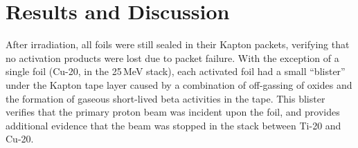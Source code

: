 \section{\label{sec:results_fe}Results and Discussion}



After irradiation, all foils were 
still sealed in their Kapton packets, verifying that no activation products were lost due to packet failure.
With the exception of a single foil (Cu-20, in the 25\,MeV stack), each activated foil had a small \enquote{blister} under the Kapton tape layer caused by a combination of 
off-gassing of oxides and the formation of gaseous short-lived beta activities in the tape.
This blister   verifies that the primary proton beam was incident upon the foil, and provides additional 
evidence 
that the beam was stopped in the stack between Ti-20 and Cu-20.
